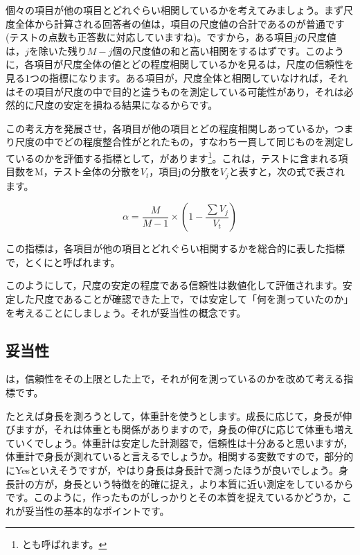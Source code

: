 \documentclass{ltjsbook}
\begin{document}
個々の項目が他の項目とどれぐらい相関しているかを考えてみましょう。まず尺度全体から計算される回答者の値は，項目の尺度値の合計であるのが普通です(テストの点数も正答数に対応していますね)。ですから，ある項目$j$の尺度値は，$j$を除いた残り$M-j$個の尺度値の和と高い相関をするはずです。このように，各項目が尺度全体の値とどの程度相関しているかを見るは，尺度の信頼性を見る1つの指標になります。ある項目が，尺度全体と相関していなければ，それはその項目が尺度の中で目的と違うものを測定している可能性があり，それは必然的に尺度の安定を損ねる結果になるからです。

この考え方を発展させ，各項目が他の項目とどの程度相関しあっているか，つまり尺度の中でどの程度整合性がとれたもの，すなわち一貫して同じものを測定しているのかを評価する指標として，があります\footnote{とも呼ばれます。}。これは，テストに含まれる項目数をM，テスト全体の分散を$V_t$，項目jの分散を$V_j$と表すと，次の式で表されます。

\[  \alpha =   \frac{M}{M-1} \times \left(1-\frac{\sum V_j}{V_t} \right) \]

この指標は，各項目が他の項目とどれぐらい相関するかを総合的に表した指標で，とくにと呼ばれます。

このようにして，尺度の安定の程度である信頼性は数値化して評価されます。安定した尺度であることが確認できた上で，では安定して「何を測っていたのか」を考えることにしましょう。それが妥当性の概念です。

\subsection{妥当性}
は，信頼性をその上限とした上で，それが何を測っているのかを改めて考える指標です。

たとえば身長を測ろうとして，体重計を使うとします。成長に応じて，身長が伸びますが，それは体重とも関係がありますので，身長の伸びに応じて体重も増えていくでしょう。体重計は安定した計測器で，信頼性は十分あると思いますが，体重計で身長が測れていると言えるでしょうか。相関する変数ですので，部分的にYesといえそうですが，やはり身長は身長計で測ったほうが良いでしょう。身長計の方が，身長という特徴を的確に捉え，より本質に近い測定をしているからです。このように，作ったものがしっかりとその本質を捉えているかどうか，これが妥当性の基本的なポイントです。
\end{document}
